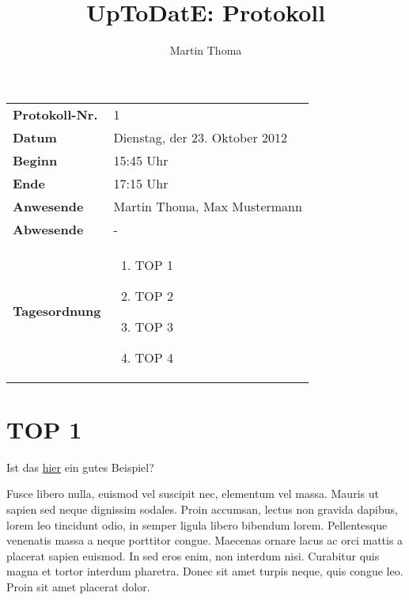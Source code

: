 \documentclass[11pt,a4paper,oneside]{scrartcl}
\newcommand\yourTitle{UpToDatE: Protokoll}
\newcommand\protokollNr{1}
\newcommand\Schriftfuehrer{Martin Thoma}
\begin{document}
 \author{\Schriftfuehrer}
 \title{\yourTitle}


\begin{center}
    \begin{tabular}{p{4.0cm} p{11.2cm}}
        \textbf{Protokoll-Nr.}      & \protokollNr\\
        \textbf{Datum}              & Dienstag, der 23. Oktober 2012\\
        \textbf{Beginn}             & 15:45 Uhr\\
        \textbf{Ende}               & 17:15 Uhr\\
        \textbf{Anwesende}          & Martin Thoma, Max Mustermann\\
        \textbf{Abwesende}          & -\\
        \textbf{Tagesordnung}       & \vspace{-7mm}%
                \begin{enumerate}[leftmargin=1.3em]%
                    \setlength{\itemsep}{-2pt}%
                    \item TOP 1
                    \item TOP 2
                    \item TOP 3
                    \item TOP 4
                \end{enumerate}
    \end{tabular}
\end{center}

\section*{TOP 1}
Ist das \href{http://www.digitale-schule-bayern.de/dsdaten/8/825.pdf}{hier}
ein gutes Beispiel?

Fusce libero nulla, euismod vel suscipit nec, elementum vel massa. 
Mauris ut sapien sed neque dignissim sodales. Proin accumsan, lectus 
non gravida dapibus, lorem leo tincidunt odio, in semper ligula 
libero bibendum lorem. Pellentesque venenatis massa a neque porttitor
congue. Maecenas ornare lacus ac orci mattis a placerat sapien 
euismod. In sed eros enim, non interdum nisi. Curabitur quis magna 
et tortor interdum pharetra. Donec sit amet turpis neque, quis congue
leo. Proin sit amet placerat dolor.
\end{document}
